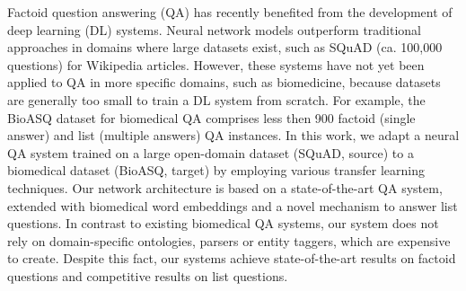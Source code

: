 Factoid question answering (QA) has recently benefited from the development of deep learning (DL) systems. Neural network models outperform traditional approaches in domains where large datasets exist, such as SQuAD (ca. 100,000 questions) for Wikipedia articles. However, these systems have not yet been applied to QA in more specific domains, such as biomedicine, because datasets are generally too small to train a DL system from scratch. For example, the BioASQ dataset for biomedical QA comprises less then 900 factoid (single answer) and list (multiple answers) QA instances. In this work, we adapt a neural QA system trained on a large open-domain dataset (SQuAD, source) to a biomedical dataset (BioASQ, target) by employing various transfer learning techniques. Our network architecture is based on a state-of-the-art QA system, extended with biomedical word embeddings and a novel mechanism to answer list questions. In contrast to existing biomedical QA systems, our system does not rely on domain-specific ontologies, parsers or entity taggers, which are expensive to create. Despite this fact, our systems achieve state-of-the-art results on factoid questions and competitive results on list questions.
